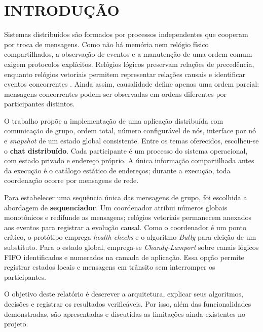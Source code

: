 %
%
\chapter{INTRODUÇÃO}\label{chap:introducao}

Sistemas distribuídos são formados por processos independentes que cooperam por
troca de mensagens. Como não há memória nem relógio físico compartilhados, a
observação de eventos e a manutenção de uma ordem comum exigem protocolos
explícitos. Relógios lógicos preservam relações de precedência, enquanto relógios
vetoriais permitem representar relações causais e identificar eventos concorrentes
\cite{lamport1978,tanenbaum2007}. Ainda assim, causalidade define apenas uma ordem
parcial: mensagens concorrentes podem ser observadas em ordens diferentes por
participantes distintos.

O trabalho propõe a implementação de uma aplicação distribuída com comunicação de
grupo, ordem total, número configurável de nós, interface por nó e \textit{snapshot} de um
estado global consistente. Entre os temas oferecidos, escolheu-se o
\textbf{chat distribuído}. Cada participante é um processo do sistema operacional,
com estado privado e endereço próprio. A única informação compartilhada antes da
execução é o catálogo estático de endereços; durante a execução, toda coordenação
ocorre por mensagens de rede.

Para estabelecer uma sequência única das mensagens de grupo, foi escolhida a
abordagem de \textbf{sequenciador}. Um coordenador atribui números globais
monotônicos e redifunde as mensagens; relógios vetoriais permanecem anexados aos
eventos para registrar a evolução causal. Como o coordenador é um ponto crítico,
o protótipo emprega \textit{health-checks} e o algoritmo \textit{Bully} para eleição de
um substituto. Para o estado global, emprega-se \textit{Chandy-Lamport} sobre canais
lógicos FIFO identificados e numerados na camada de aplicação. Essa opção permite
registrar estados locais e mensagens em trânsito sem interromper os participantes.

O objetivo deste relatório é descrever a arquitetura, explicar seus algoritmos, decisões e
registrar os resultados verificáveis. Por isso, além das funcionalidades demonstradas, 
são apresentadas e discutidas as limitações ainda existentes no projeto.
